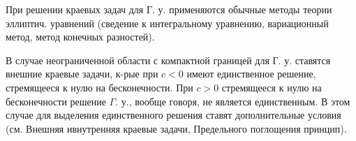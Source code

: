 \documentclass[10pt]{article}
\begin{document}
При решении краевых задач для Г. у. применяются обычные методы теории эллиптич. уравнений (сведение к интегральному уравнению, вариационный метод, метод конечных разностей).



В случае неограниченной области с компактной границей для Г. у. ставятся внешние краевые задачи, к-рые при $c<0$ имеют единственное решение, стремящееся к нулю на бесконечности. При $c>0$ стремящееся к нулю на бесконечности решение $\Gamma$. у., вообще говоря, не является единственным. В этом случае для выделения единственного решения ставят дополнительные условия (см. Внешняя ивнутренняя краевые задачи, Предельного поглощения принцип).
\end{document}
